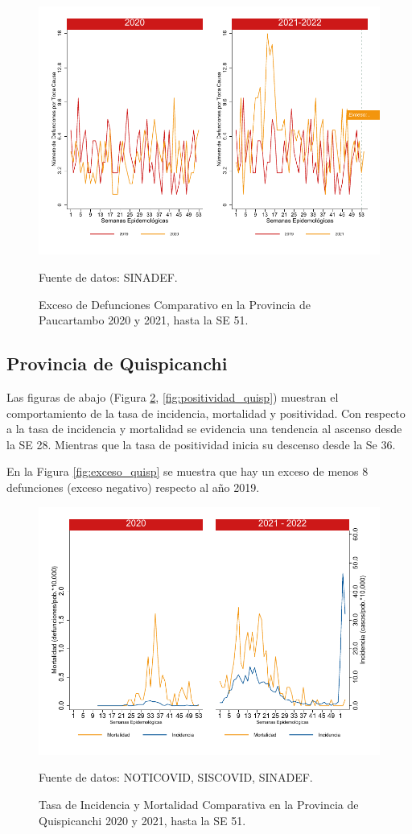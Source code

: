 \documentclass[12pt,a4paper,openany]{book}
\begin{document}
		\begin{figure}[h]
			\caption{Exceso de Defunciones Comparativo en la Provincia de Paucartambo 2020 y 2021, hasta la SE 51.}\label{fig:exceso_paucartam}
			\begin{center}
				\includegraphics[width=0.7\linewidth]{../figuras/exceso_11}
			\end{center}
			{\footnotesize {Fuente de datos: SINADEF.}}
		\end{figure}
		
		\clearpage
		
		\subsection*{Provincia de Quispicanchi}
		\noindent Las figuras de abajo (Figura \ref{fig:inc_mort_quisp}, \ref{fig:positividad_quisp}) muestran el comportamiento de la tasa de incidencia, mortalidad y  positividad. Con respecto a la tasa de incidencia y mortalidad se evidencia una tendencia al ascenso desde la SE 28. Mientras que la tasa de positividad inicia su descenso desde la Se 36.   

		
	En la Figura \ref{fig:exceso_quisp} se muestra que hay un exceso de menos 8 defunciones (exceso negativo) respecto al año 2019.
		
		\begin{figure}[h]
			\caption{Tasa de Incidencia y Mortalidad Comparativa en la Provincia de Quispicanchi 2020 y 2021, hasta la SE 51.}\label{fig:inc_mort_quisp}
			\begin{center}
				\includegraphics[width=0.7\linewidth]{../figuras/incidencia_mortalidad_20_21_12}
			\end{center}
			{\footnotesize {Fuente de datos: NOTICOVID, SISCOVID, SINADEF.}}
		\end{figure}
		
\end{document}
